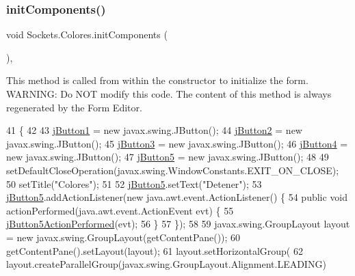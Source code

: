 \subsubsection{\texorpdfstring{init\+Components()}{initComponents()}}
{\footnotesize\ttfamily void Sockets.\+Colores.\+init\+Components (\begin{DoxyParamCaption}{ }\end{DoxyParamCaption})\hspace{0.3cm}{\ttfamily [inline]}, {\ttfamily [private]}}

This method is called from within the constructor to initialize the form. W\+A\+R\+N\+I\+NG\+: Do N\+OT modify this code. The content of this method is always regenerated by the Form Editor. 
\begin{DoxyCode}
41                                   \{
42 
43         \mbox{\hyperlink{class_sockets_1_1_colores_ab40711ac8b3b4ea81488754689d89db6}{jButton1}} = \textcolor{keyword}{new} javax.swing.JButton();
44         \mbox{\hyperlink{class_sockets_1_1_colores_a4f1d1e8c1b92fee9bca285f52bf66b84}{jButton2}} = \textcolor{keyword}{new} javax.swing.JButton();
45         \mbox{\hyperlink{class_sockets_1_1_colores_a7bba899d5ca449162ba9e0b7b3ae4264}{jButton3}} = \textcolor{keyword}{new} javax.swing.JButton();
46         \mbox{\hyperlink{class_sockets_1_1_colores_ac555b14a5e9aa5fd552356f04d884d31}{jButton4}} = \textcolor{keyword}{new} javax.swing.JButton();
47         \mbox{\hyperlink{class_sockets_1_1_colores_a4cacc03eb161c98ee51cfdd6970ecd35}{jButton5}} = \textcolor{keyword}{new} javax.swing.JButton();
48 
49         setDefaultCloseOperation(javax.swing.WindowConstants.EXIT\_ON\_CLOSE);
50         setTitle(\textcolor{stringliteral}{"Colores"});
51 
52         \mbox{\hyperlink{class_sockets_1_1_colores_a4cacc03eb161c98ee51cfdd6970ecd35}{jButton5}}.setText(\textcolor{stringliteral}{"Detener"});
53         \mbox{\hyperlink{class_sockets_1_1_colores_a4cacc03eb161c98ee51cfdd6970ecd35}{jButton5}}.addActionListener(\textcolor{keyword}{new} java.awt.event.ActionListener() \{
54             \textcolor{keyword}{public} \textcolor{keywordtype}{void} actionPerformed(java.awt.event.ActionEvent evt) \{
55                 \mbox{\hyperlink{class_sockets_1_1_colores_a02b7b95d6d82af2a358d2d6a358a742b}{jButton5ActionPerformed}}(evt);
56             \}
57         \});
58 
59         javax.swing.GroupLayout layout = \textcolor{keyword}{new} javax.swing.GroupLayout(getContentPane());
60         getContentPane().setLayout(layout);
61         layout.setHorizontalGroup(
62             layout.createParallelGroup(javax.swing.GroupLayout.Alignment.LEADING)

\end{DoxyCode}
